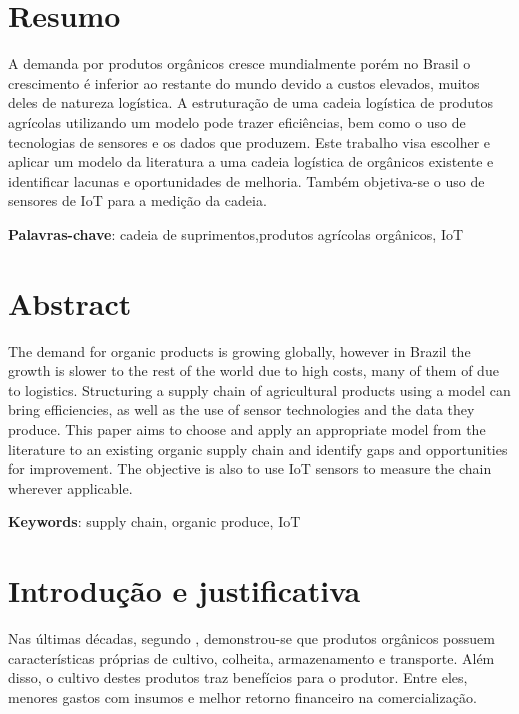 \documentclass[
	12pt,				%
	openright,			%
	oneside,			%
	a4paper,			%
	english,			%
	french,				%
	spanish,			%
	brazil,				%
	]{abntex2}
\begin{document}
\frenchspacing 

\imprimircapa
\imprimirfolhaderosto

\chapter*{Resumo}
A demanda por produtos orgânicos cresce mundialmente porém no Brasil o crescimento é inferior ao restante do mundo devido a custos elevados, muitos deles de natureza logística. A estruturação de uma cadeia logística de produtos agrícolas utilizando um modelo pode trazer eficiências, bem como o uso de tecnologias de sensores e os dados que produzem. 
Este trabalho visa escolher e aplicar um modelo da literatura a uma cadeia logística de orgânicos existente e identificar lacunas e oportunidades de melhoria. Também objetiva-se o uso de sensores de IoT para a medição da cadeia.

\textbf{Palavras-chave}: cadeia de suprimentos,produtos agrícolas orgânicos, IoT

\chapter*{Abstract}
The demand for organic products is growing globally, however in Brazil the growth is slower to the rest of the world due to high costs, many of them of due to logistics. Structuring a supply chain of agricultural products using a model can bring efficiencies, as well as the use of sensor technologies and the data they produce.
This paper aims to choose and apply an appropriate model from the literature to an existing organic supply chain and identify gaps and opportunities for improvement. The objective is also to use IoT sensors to measure the chain wherever applicable.

\textbf{Keywords}: supply chain, organic produce, IoT

\chapter{Introdução e justificativa}

Nas últimas décadas, segundo , demonstrou-se que produtos orgânicos possuem características próprias de cultivo, colheita, armazenamento e  transporte. Além disso, o cultivo destes produtos traz benefícios para o produtor. Entre eles, menores gastos com insumos e melhor retorno financeiro na comercialização. 
\end{document}
